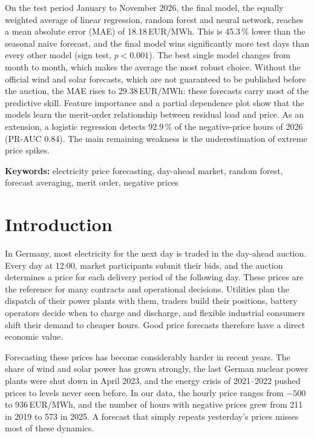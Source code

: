 \documentclass[12pt,oneside]{article}
\begin{document}
On the test period January to November 2026, the final model, the equally weighted average of linear regression, random forest and neural network, reaches a mean absolute error (MAE) of 18.18\,EUR/MWh. This is 45.3\,\% lower than the seasonal naive forecast, and the final model wins significantly more test days than every other model (sign test, $p < 0.001$). The best single model changes from month to month, which makes the average the most robust choice. Without the official wind and solar forecasts, which are not guaranteed to be published before the auction, the MAE rises to 29.38\,EUR/MWh: these forecasts carry most of the predictive skill. Feature importance and a partial dependence plot show that the models learn the merit-order relationship between residual load and price. As an extension, a logistic regression detects 92.9\,\% of the negative-price hours of 2026 (PR-AUC 0.84). The main remaining weakness is the underestimation of extreme price spikes.

\textbf{Keywords:} electricity price forecasting, day-ahead market, random forest, forecast averaging, merit order, negative prices


\clearpage
{}
    \setcounter{page}{1}
\lhead{\nouppercase{\leftmark}}


\section{Introduction} \label{Introduction}

In Germany, most electricity for the next day is traded in the day-ahead auction. Every day at 12:00, market participants submit their bids, and the auction determines a price for each delivery period of the following day. These prices are the reference for many contracts and operational decisions. Utilities plan the dispatch of their power plants with them, traders build their positions, battery operators decide when to charge and discharge, and flexible industrial consumers shift their demand to cheaper hours. Good price forecasts therefore have a direct economic value.

Forecasting these prices has become considerably harder in recent years. The share of wind and solar power has grown strongly, the last German nuclear power plants were shut down in April 2023, and the energy crisis of 2021--2022 pushed prices to levels never seen before. In our data, the hourly price ranges from $-500$ to 936\,EUR/MWh, and the number of hours with negative prices grew from 211 in 2019 to 573 in 2025. A forecast that simply repeats yesterday's prices misses most of these dynamics.
\end{document}
